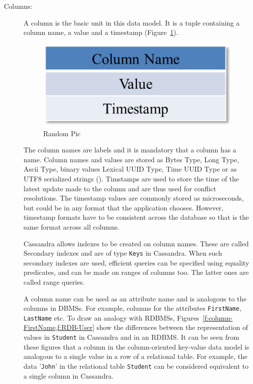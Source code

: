 \begin{description}
\item[Columns:]  A column is the basic unit in this data model. It is a tuple
containing a column name, a value and a timestamp (Figure~\ref{f:column}).

\begin{figure}[h]
	\centering
	\includegraphics[width=.4\textwidth]{./figure/Example/Column.png}
	\caption{Random Pic}\label{f:column}
\end{figure}

The column names are labels  and it is mandatory that a column has a
name. Column names and values are stored as Bytes Type, Long Type,
Ascii Type, binary values Lexical UUID Type, Time UUID Type or as UTF8
serialized strings (). Timstamps are used to store the time of the
latest update made to the column and are thus used for conflict resolutions. The
timestamp values are commonly stored as microseconds, but could be in any format
that the application chooses. However, timestamp formats have to be consistent
across the database so that is the same format across all columns.

Cassandra allows indexes to be created on column names. These are called
Secondary indexes and are of type \texttt{Keys} in Cassandra. When such secondary indexes
are used, efficient queries can be specified using equality predicates, and
can be made on ranges of columns too. The latter ones are called range queries.

A column name can be used as an attribute name and is analogous to the columns
in \acp{DBMS}. For example, columns for the attributes \texttt{FirstName},
\texttt{LastName} etc. To draw an analogy with \acp{RDBMS},
Figures~\ref{f:column-FirstName,f:RDB-User} show the differences between the
representation of values in \texttt{Student} in Cassandra and in an \ac{RDBMS}.
It can be seen from these figures that a column in the column-oriented key-value
data model is analogous to a single value in a row of a relational table. For
example, the data '\texttt{John}' in the relational table \texttt{Student} can
be considered equivalent to a single column in Cassandra.


\end{description}
